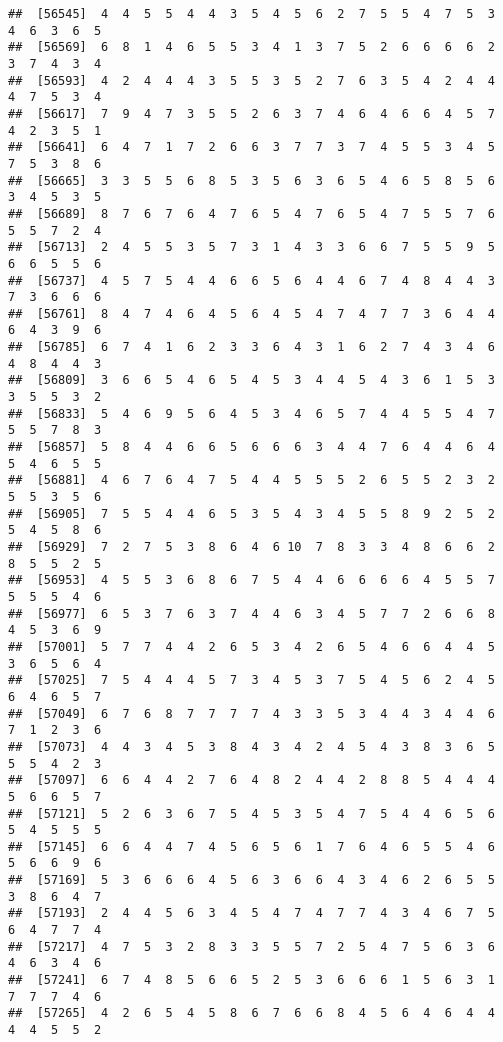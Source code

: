 \documentclass[
]{book}
\begin{document}
\begin{verbatim}
##  [56545]  4  4  5  5  4  4  3  5  4  5  6  2  7  5  5  4  7  5  3  4  6  3  6  5
##  [56569]  6  8  1  4  6  5  5  3  4  1  3  7  5  2  6  6  6  6  2  3  7  4  3  4
##  [56593]  4  2  4  4  4  3  5  5  3  5  2  7  6  3  5  4  2  4  4  4  7  5  3  4
##  [56617]  7  9  4  7  3  5  5  2  6  3  7  4  6  4  6  6  4  5  7  4  2  3  5  1
##  [56641]  6  4  7  1  7  2  6  6  3  7  7  3  7  4  5  5  3  4  5  7  5  3  8  6
##  [56665]  3  3  5  5  6  8  5  3  5  6  3  6  5  4  6  5  8  5  6  3  4  5  3  5
##  [56689]  8  7  6  7  6  4  7  6  5  4  7  6  5  4  7  5  5  7  6  5  5  7  2  4
##  [56713]  2  4  5  5  3  5  7  3  1  4  3  3  6  6  7  5  5  9  5  6  6  5  5  6
##  [56737]  4  5  7  5  4  4  6  6  5  6  4  4  6  7  4  8  4  4  3  7  3  6  6  6
##  [56761]  8  4  7  4  6  4  5  6  4  5  4  7  4  7  7  3  6  4  4  6  4  3  9  6
##  [56785]  6  7  4  1  6  2  3  3  6  4  3  1  6  2  7  4  3  4  6  4  8  4  4  3
##  [56809]  3  6  6  5  4  6  5  4  5  3  4  4  5  4  3  6  1  5  3  3  5  5  3  2
##  [56833]  5  4  6  9  5  6  4  5  3  4  6  5  7  4  4  5  5  4  7  5  5  7  8  3
##  [56857]  5  8  4  4  6  6  5  6  6  6  3  4  4  7  6  4  4  6  4  5  4  6  5  5
##  [56881]  4  6  7  6  4  7  5  4  4  5  5  5  2  6  5  5  2  3  2  5  5  3  5  6
##  [56905]  7  5  5  4  4  6  5  3  5  4  3  4  5  5  8  9  2  5  2  5  4  5  8  6
##  [56929]  7  2  7  5  3  8  6  4  6 10  7  8  3  3  4  8  6  6  2  8  5  5  2  5
##  [56953]  4  5  5  3  6  8  6  7  5  4  4  6  6  6  6  4  5  5  7  5  5  5  4  6
##  [56977]  6  5  3  7  6  3  7  4  4  6  3  4  5  7  7  2  6  6  8  4  5  3  6  9
##  [57001]  5  7  7  4  4  2  6  5  3  4  2  6  5  4  6  6  4  4  5  3  6  5  6  4
##  [57025]  7  5  4  4  4  5  7  3  4  5  3  7  5  4  5  6  2  4  5  6  4  6  5  7
##  [57049]  6  7  6  8  7  7  7  7  4  3  3  5  3  4  4  3  4  4  6  7  1  2  3  6
##  [57073]  4  4  3  4  5  3  8  4  3  4  2  4  5  4  3  8  3  6  5  5  5  4  2  3
##  [57097]  6  6  4  4  2  7  6  4  8  2  4  4  2  8  8  5  4  4  4  5  6  6  5  7
##  [57121]  5  2  6  3  6  7  5  4  5  3  5  4  7  5  4  4  6  5  6  5  4  5  5  5
##  [57145]  6  6  4  4  7  4  5  6  5  6  1  7  6  4  6  5  5  4  6  5  6  6  9  6
##  [57169]  5  3  6  6  6  4  5  6  3  6  6  4  3  4  6  2  6  5  5  3  8  6  4  7
##  [57193]  2  4  4  5  6  3  4  5  4  7  4  7  7  4  3  4  6  7  5  6  4  7  7  4
##  [57217]  4  7  5  3  2  8  3  3  5  5  7  2  5  4  7  5  6  3  6  4  6  3  4  6
##  [57241]  6  7  4  8  5  6  6  5  2  5  3  6  6  6  1  5  6  3  1  7  7  7  4  6
##  [57265]  4  2  6  5  4  5  8  6  7  6  6  8  4  5  6  4  6  4  4  4  4  5  5  2

\end{verbatim}
\end{document}
